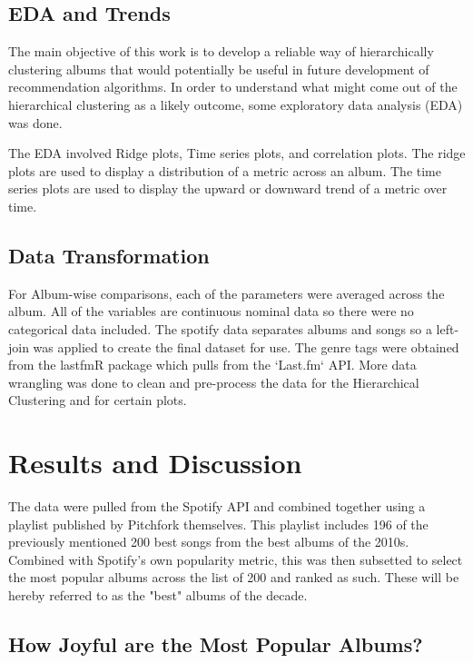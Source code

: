 \documentclass[conference]{IEEEtran}
\begin{document}
\subsection{EDA and Trends}

The main objective of this work is to develop a reliable way of hierarchically clustering albums that would potentially be useful in future development of recommendation algorithms. In order to understand what might come out of the hierarchical clustering as a likely outcome, some exploratory data analysis (EDA) was done. 

The EDA involved Ridge plots, Time series plots, and correlation plots. The ridge plots are used to display a distribution of a metric across an album. The time series plots are used to display the upward or downward trend of a metric over time. 


\subsection{Data Transformation}

For Album-wise comparisons, each of the parameters were averaged across the album.  All of the variables are continuous nominal data so there were no categorical data included. The spotify data separates albums and songs so a left-join was applied to create the final dataset for use. The genre tags were obtained from the lastfmR package which pulls from the `Last.fm` API. More data wrangling was done to clean and pre-process the data for the Hierarchical Clustering and for certain plots. 


\section{Results and Discussion}

The data were pulled from the Spotify API and combined together using a playlist published by Pitchfork themselves. This playlist includes 196 of the previously mentioned 200 best songs from the best albums of the 2010s. Combined with Spotify's own popularity metric, this was then subsetted to select the most popular albums across the list of 200 and ranked as such. These will be hereby referred to as the "best" albums of the decade. 

\subsection{How Joyful are the Most Popular Albums?}
\end{document}
